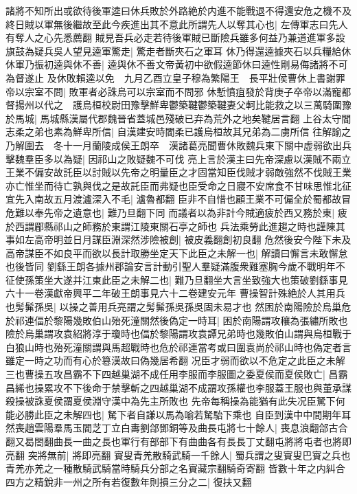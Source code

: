 諸將不知所出或欲待後軍逵曰休兵敗於外路絶於内進不能戰退不得還安危之機不及終日賊以軍無後繼故至此今疾進出其不意此所謂先人以奪其心也|{
	左傳軍志曰先人有奪人之心先悉薦翻}
賊見吾兵必走若待後軍賊已斷險兵雖多何益乃兼道進軍多設旗鼓為疑兵吳人望見逵軍驚走|{
	驚走者斷夾石之軍耳}
休乃得還逵據夾石以兵糧給休休軍乃振初逵與休不善|{
	逵與休不善文帝黃初中欲假逵節休曰逵性剛易侮諸將不可為督遂止}
及休敗賴逵以免　九月乙酉立皇子穆為繁陽王　長平壯侯曹休上書謝罪帝以宗室不問|{
	敗軍者必誅烏可以宗室而不問邪}
休慙憤疽發於背庚子卒帝以滿寵都督揚州以代之　護烏桓校尉田豫擊鮮卑鬱築鞬鬱築鞬妻父軻比能救之以三萬騎圍豫於馬城|{
	馬城縣漢屬代郡魏晉省蓋城邑殘破已弃為荒外之地矣鞬居言翻}
上谷太守閻志柔之弟也素為鮮卑所信|{
	自漢建安時閻柔已護烏桓故其兄弟為二虜所信}
往解諭之乃解圍去　冬十一月蘭陵成侯王朗卒　漢諸葛亮聞曹休敗魏兵東下關中虚弱欲出兵擊魏羣臣多以為疑|{
	因祁山之敗疑魏不可伐}
亮上言於漢主曰先帝深慮以漢賊不兩立王業不偏安故託臣以討賊以先帝之明量臣之才固當知臣伐賊才弱敵強然不伐賊王業亦亡惟坐而待亡孰與伐之是故託臣而弗疑也臣受命之日寢不安席食不甘味思惟北征宜先入南故五月渡瀘深入不毛|{
	瀘魯都翻}
臣非不自惜也顧王業不可偏全於蜀都故冒危難以奉先帝之遺意也|{
	難乃旦翻下同}
而議者以為非計今賊適疲於西又務於東|{
	疲於西謂郿縣祁山之師務於東謂江陵東關石亭之師也}
兵法乘勞此進趨之時也謹陳其事如左高帝明並日月謀臣淵深然涉險被創|{
	被皮義翻創初良翻}
危然後安今陛下未及高帝謀臣不如良平而欲以長計取勝坐定天下此臣之未解一也|{
	解讀曰懈言未敢懈怠也後皆同}
劉繇王朗各據州郡論安言計動引聖人羣疑滿腹衆難塞胸今歲不戰明年不征使孫策坐大遂并江東此臣之未解二也|{
	難乃旦翻坐大言坐致強大也策破劉繇事見六十一卷漢獻帝興平二年破王朗事見六十二卷建安元年}
曹操智計殊絶於人其用兵也髣髴孫吳|{
	以操之善用兵亮謂之髣髴孫吳孫吳固未易才也}
然困於南陽險於烏巢危於祁連偪於黎陽幾敗伯山殆死潼關然後偽定一時耳|{
	困於南陽謂攻穰為張繡所敗也險於烏巢謂攻袁紹將淳于瓊時也偪於黎陽謂攻袁譚兄弟時也幾敗伯山謂與烏桓戰于白狼山時也殆死潼關謂與馬超戰時也危於祁連當考或曰圍袁尚於祁山時也偽定者言雖定一時之功而有心於簒漢故曰偽幾居希翻}
况臣才弱而欲以不危定之此臣之未解三也曹操五攻昌霸不下四越巢湖不成任用李服而李服圖之委夏侯而夏侯敗亡|{
	昌霸昌絺也操累攻不下後命于禁擊斬之四越巢湖不成謂攻孫權也李服蓋王服也與董承謀殺操被誅夏侯謂夏侯淵守漢中為先主所敗也}
先帝每稱操為能猶有此失况臣駑下何能必勝此臣之未解四也|{
	駑下者自謙以馬為喻若駑駘下乘也}
自臣到漢中中間期年耳然喪趙雲陽羣馬玉閻芝丁立白夀劉郃鄧銅等及曲長屯將七十餘人|{
	喪息浪翻郃古合翻又曷閤翻曲長一曲之長也軍行有部部下有曲曲各有長長丁丈翻屯將將屯者也將即亮翻}
突將無前|{
	將即亮翻}
賨叟青羌散騎武騎一千餘人|{
	蜀兵謂之叟賨叟巴賨之兵也青羌亦羌之一種散騎武騎當時騎兵分部之名賨藏宗翻騎奇寄翻}
皆數十年之内糾合四方之精銳非一州之所有若復數年則損三分之二|{
	復扶又翻}
